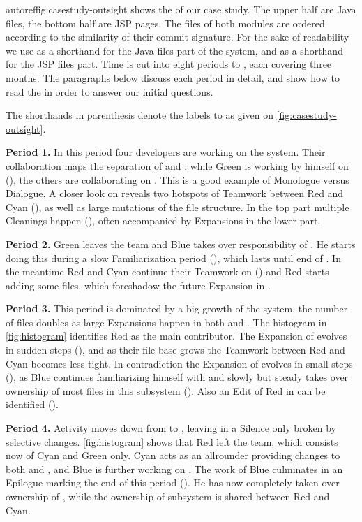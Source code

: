 autoref{fig:casestudy-outsight} shows the \omap of our case study. The upper half are Java files, the bottom half are JSP pages. The files of both modules are ordered according to the similarity of their commit signature. For the sake of readability we use  as a shorthand for the Java files part of the system, and  as a shorthand for the JSP files part. Time is cut into eight periods  to , each covering three months. The paragraphs below discuss each period in detail, and show how to read the \omap in order to answer our initial questions.

The shorthands in parenthesis denote the labels  to  as given on \autoref{fig:casestudy-outsight}.

\textbf{Period 1.} In this period four developers are working on the system. Their collaboration maps the separation of  and : while Green is working by himself on  (), the others are collaborating on . This is a good example of Monologue versus Dialogue. A closer look on  reveals two hotspots of Teamwork between Red and Cyan (), as well as large mutations of the file structure. In the top part multiple Cleanings happen (), often accompanied by Expansions in the lower part.

\textbf{Period 2.} Green leaves the team and Blue takes over responsibility of . He starts doing this during a slow Familiarization period (), which lasts until end of . In the meantime Red and Cyan continue their Teamwork on  () and Red starts adding some files, which foreshadow the future Expansion in .

\textbf{Period 3.} This period is dominated by a big growth of the system, the number of files doubles as large Expansions happen in both  and . The histogram in \autoref{fig:histogram} identifies Red as the main contributor. The Expansion of  evolves in sudden steps (), and as their file base grows the Teamwork between Red and Cyan becomes less tight. In contradiction the Expansion of  evolves in small steps (), as Blue continues familiarizing himself with  and slowly but steady takes over ownership of most files in this subsystem (). Also an Edit of Red in  can be identified ().

\textbf{Period 4.} Activity moves down from  to , leaving  in a Silence only broken by selective changes. \autoref{fig:histogram} shows that Red left the team, which consists now of Cyan and Green only. Cyan acts as an allrounder providing changes to both  and , and Blue is further working on . The work of Blue culminates in an Epilogue marking the end of this period (). He has now completely taken over ownership of , while the ownership of subsystem  is shared between Red and Cyan.


